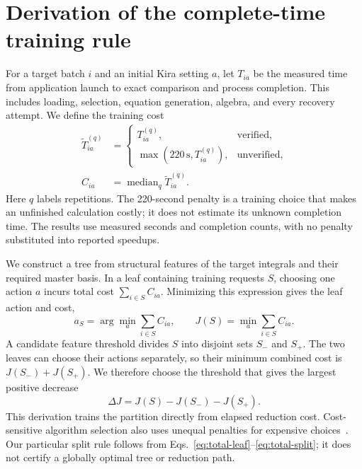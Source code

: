 \section{Derivation of the complete-time training rule}
\label{app:total-time}
For a target batch $i$ and an initial Kira setting $a$, let $T_{ia}$ be the measured time from application launch to exact comparison and process completion. This includes loading, selection, equation generation, algebra, and every recovery attempt. We define the training cost
\begin{equation}
 \begin{aligned}
 \widetilde T_{ia}^{(q)}&=\begin{cases}T_{ia}^{(q)},&\text{verified},\\
 \max(220\,\mathrm{s},T_{ia}^{(q)}),&\text{unverified},
 \end{cases}\\
 C_{ia}&=\operatorname{median}_{q}\widetilde T_{ia}^{(q)}.
 \end{aligned}
 \label{eq:total-cost}
\end{equation}
Here $q$ labels repetitions. The 220-second penalty is a training choice that makes an unfinished calculation costly; it does not estimate its unknown completion time. The results use measured seconds and completion counts, with no penalty substituted into reported speedups.

We construct a tree from structural features of the target integrals and their required master basis. In a leaf containing training requests $S$, choosing one action $a$ incurs total cost $\sum_{i\in S}C_{ia}$. Minimizing this expression gives the leaf action and cost,
\begin{equation}
 a_S=\arg\min_a\sum_{i\in S}C_{ia},\qquad
 J(S)=\min_a\sum_{i\in S}C_{ia}.
 \label{eq:total-leaf}
\end{equation}
A candidate feature threshold divides $S$ into disjoint sets $S_-$ and $S_+$. The two leaves can choose their actions separately, so their minimum combined cost is $J(S_-)+J(S_+)$. We therefore choose the threshold that gives the largest positive decrease
\begin{equation}
 \Delta J=J(S)-J(S_-)-J(S_+).
 \label{eq:total-split}
\end{equation}
This derivation trains the partition directly from elapsed reduction cost. Cost-sensitive algorithm selection also uses unequal penalties for expensive choices~\cite{Xu2011HydraMIP}. Our particular split rule follows from Eqs.~\eqref{eq:total-leaf}--\eqref{eq:total-split}; it does not certify a globally optimal tree or reduction path.

